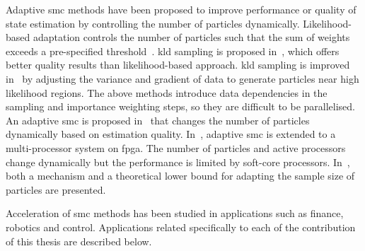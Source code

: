 Adaptive \gls{smc} methods have been proposed to improve performance or quality of state estimation by controlling the number of particles dynamically. 
Likelihood-based adaptation controls the number of particles such that the sum of weights exceeds a pre-specified threshold~\cite{koller98}.
\gls{kld} sampling is proposed in~\cite{fox03}, which offers better quality results than likelihood-based approach. 
\gls{kld} sampling is improved in~\cite{park10} by adjusting the variance and gradient of data to generate particles near high likelihood regions. 
The above methods introduce data dependencies in the sampling and importance weighting steps, so they are difficult to be parallelised. 
An adaptive \gls{smc} is proposed in~\cite{bolic02} that changes the number of particles dynamically based on estimation quality. 
In~\cite{chau12fpl}, adaptive \gls{smc} is extended to a multi-processor system on \gls{fpga}.
The number of particles and active processors change dynamically but the performance is limited by soft-core processors.
In~\cite{liu07}, both a mechanism and a theoretical lower bound for adapting the sample size of particles are presented.

Acceleration of \gls{smc} methods has been studied in applications such as finance, robotics and control.
Applications related specifically to each of the contribution of this thesis are described below.




